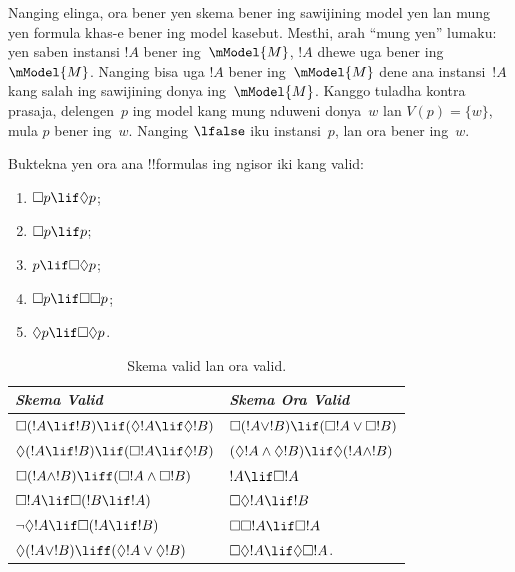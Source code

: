 \documentclass[../../../include/open-logic-section]{subfiles}
\begin{document}
Nanging elinga, ora bener yen skema bener ing sawijining model
yen lan mung yen formula khas-e bener ing model kasebut.
Mesthi, arah ``mung yen'' lumaku: yen saben instansi $!A$ bener
ing~$\mModel{M}$, $!A$ dhewe uga bener ing~$\mModel{M}$. Nanging
bisa uga $!A$ bener ing~$\mModel{M}$ dene ana instansi~$!A$ kang
salah ing sawijining donya ing~$\mModel{M}$. Kanggo tuladha kontra
prasaja, delengen~$p$ ing model kang mung nduweni donya~$w$ lan
$V(p) = \{w\}$, mula $p$ bener ing~$w$. Nanging $\lfalse$ iku
instansi~$p$, lan ora bener ing~$w$.

\begin{prob}
  Buktekna yen ora ana !!{formula}s ing ngisor iki kang valid:
  \begin{enumerate}
    \item[\Ax{D}:] \quad $\Box p \lif \Diamond p$;
    \item[\Ax{T}:] \quad $\Box p \lif p$;
    \item[\Ax{B}:] \quad $p \lif \Box\Diamond p$;
    \item[\Ax{4}:] \quad $\Box p \lif \Box \Box p$;
    \item[\Ax{5}:] \quad $\Diamond p \lif \Box \Diamond
      p$.
  \end{enumerate}
\end{prob}

\begin{table}[t]
    \centering
    \begin{tabular}{| l || l |}
      \hline
      {\emph{Skema Valid}} & {\emph{Skema Ora Valid}} \\
      \hline\hline
      $\Box(!A \lif !B) \lif (\Diamond !A \lif \Diamond !B)$
      & $\Box (!A \lor !B) \lif (\Box !A \lor \Box !B)$ \\
      $\Diamond (!A \lif !B) \lif (\Box !A \lif \Diamond
      !B)$
      & $(\Diamond !A \land \Diamond !B) \lif \Diamond (!A
      \land !B)$\\
      $\Box (!A \land !B) \liff (\Box !A \land \Box !B)$
      & $!A \lif \Box !A$ \\
      $\Box !A \lif \Box (!B \lif !A)$
      & $\Box \Diamond !A \lif !B$ \\
      $\lnot \Diamond !A \lif \Box (!A \lif !B)$
      & $\Box \Box !A \lif \Box !A$ \\
      $\Diamond (!A \lor !B) \liff (\Diamond !A \lor
      \Diamond !B)$
      & $\Box \Diamond !A \lif \Diamond \Box !A$. \\
      \hline
    \end{tabular}
    \caption{Skema valid lan ora valid.}
\end{table}
\end{document}
